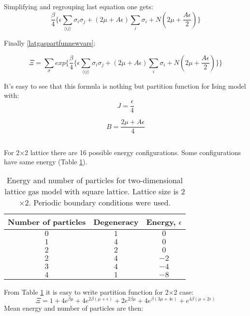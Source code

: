 \documentclass[10pt]{article}
\begin{document}
Simplifying and regrouping last equation one gets:
\begin{equation}
\frac {\beta}{4} \Bigg\{ \epsilon \sum_{\langle ij\rangle }\sigma_i\sigma_j  + (2\mu +A\epsilon)\sum_{i}\sigma_i + N(2\mu + \frac{A\epsilon}{2}) \Bigg\}
\end{equation}

Finally \ref{latgaspartfunnewvars}:

\begin{equation}\label{chtd}
\Xi =\sum_{\sigma}exp \Bigg\{\frac {\beta}{4} \Bigg\{ \epsilon \sum_{\langle ij\rangle }\sigma_i\sigma_j  + (2\mu +A\epsilon)\sum_{i}\sigma_i + N(2\mu + \frac{A\epsilon}{2}) \Bigg\}\Bigg\}
\end{equation}

It's easy to see that this formula is nothing but partition function for Ising model with:
\[
J=\frac{\epsilon}{4}
\]


\[
B=\frac{2\mu + A\epsilon}{4}
\]
\subsection{}
For 2$\times$2 lattice there are 16 possible energy configurations. Some configurations have same energy (Table \ref{tab:2x2}).

\begin{table}[h!]
  \caption{Energy and number of particles for two-dimensional lattice gas model with square lattice. Lattice size is 2$\times$2. Periodic boundary conditions were used.}
  \label{tab:2x2}
  \begin{center}
    \begin{tabular}{c|c|c}
    \hline
		Number of particles & Degeneracy & Energy, $\epsilon$ \\
        \hline
	$	0 $  & $ 1 $ & $  0 $   \\
	$	1 $  & $ 4 $ & $  0 $   \\
	$	2 $  & $ 2 $ & $  0 $   \\
	$	2 $  & $ 4 $ & $  -2 $   \\
	$	3 $  & $ 4 $ & $  -4 $   \\
  $	4 $  & $ 1 $ & $  -8 $   \\

	\end{tabular}
  \end{center}
\end{table}

From Table \ref{tab:2x2} it is easy to write partition function for 2$\times$2 case:
\begin{equation}\label{eg:taskb:pfun}
\Xi = 1 + 4e^{\beta \mu} + 4e^{2\beta( \mu + \epsilon)} + 2e^{2\beta \mu} + 4e^{\beta(3\mu + 4\epsilon)} + e^{4\beta( \mu + 2\epsilon)}
\end{equation}
Mean energy and number of particles are then:
\end{document}
